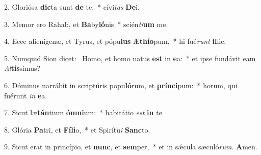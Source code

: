 2. Gloriósa \textbf{dic}ta sunt \textbf{de} te,~*  cívi\textit{tas} \textbf{De}i.\

3. Memor ero Rahab, et \textbf{Ba}by\textbf{ló}nis~*  scién\textit{ti}\textbf{um} me.\

4. Ecce alienígenæ, et Tyrus, et pópu\textbf{lus} Æ\textbf{thí}\textbf{o}pum,~*  hi fué\textit{runt} \textbf{il}lic.\

5. Numquid Sion dicet: \dag\  Homo, et homo natus \textbf{est} in \textbf{e}a:~*  et ipse fundávit eam \textit{Al}\textbf{tís}simus?\

6. Dóminus narrábit in scriptúris popu\textbf{ló}rum, et \textbf{prín}\textbf{ci}pum:~*  horum, qui fuérunt \textit{in} \textbf{e}a.\

7. Sicut læ\textbf{tán}tium \textbf{óm}\textbf{ni}um:~*  habitátio \textit{est} \textbf{in} te.\

8. Glória \textbf{Pa}tri, et \textbf{Fí}\textbf{li}o,~*  et Spirítu\textit{i} \textbf{Sanc}to.\

9. Sicut erat in princípio, et \textbf{nunc}, et \textbf{sem}per,~*  et in sǽcula sæculó\textit{rum}. \textbf{A}men.\

